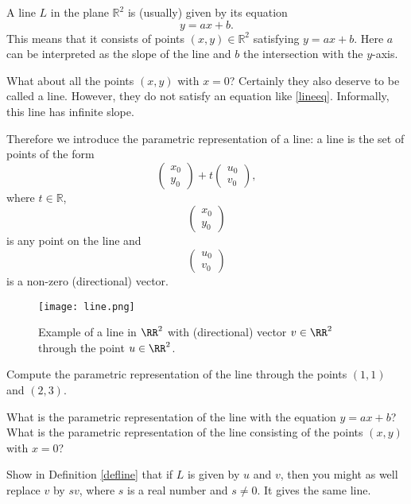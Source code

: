 \documentclass{article}
\begin{document}
\begin{example}
A line $L$ in the plane $\mathbb{R}^2$ is (usually) given by its equation
\begin{equation}\label{lineeq}
y = a x + b.
\end{equation}
This means that it consists of points $(x, y)\in \mathbb{R}^2$ satisfying $y = a x + b$.
Here $a$ can be interpreted as the slope of the line and $b$ the intersection with the
$y$-axis.

What about all the points $(x, y)$ with $x = 0$? Certainly they also deserve to be called
a line. However, they do not satisfy an equation like \eqref{lineeq}. Informally, this line
has infinite slope.

Therefore we introduce the parametric representation of a line: a line is the
set of points of the form
$$
\begin{pmatrix} x_0 \\ y_0 \end{pmatrix} +
t \begin{pmatrix} u_0 \\ v_0 \end{pmatrix},
$$
where $t\in \mathbb{R}$,
$$
\begin{pmatrix} x_0 \\ y_0\end{pmatrix}
$$
is any point on the line and
$$
\begin{pmatrix} u_0 \\ v_0\end{pmatrix}
$$
is a non-zero (directional) vector.

\begin{figure}
  \texttt{[image: line.png]}
  \begin{center}
    Example of a line in $\RR^2$ with (directional) vector $v\in \RR^2$ through the point $u\in \RR^2$.
  \end{center}
\end{figure}


\end{example}



\beginshex
Compute the parametric representation of the line through the points $(1, 1)$ and $(2, 3)$.
\endshex

\beginshex
What is the parametric representation of the line with the equation
$y = a x + b$? What is the parametric representation of the
line consisting of the points $(x, y)$ with $x=0$?
\endshex


    \beginshex
    Show in Definition \ref{defline} that if $L$ is given by $u$ and $v$, then
    you might as well replace $v$ by $s v$, where $s$ is a real number and $s\neq 0$.  It gives
    the same line.
    \endshex
    
\end{document}
